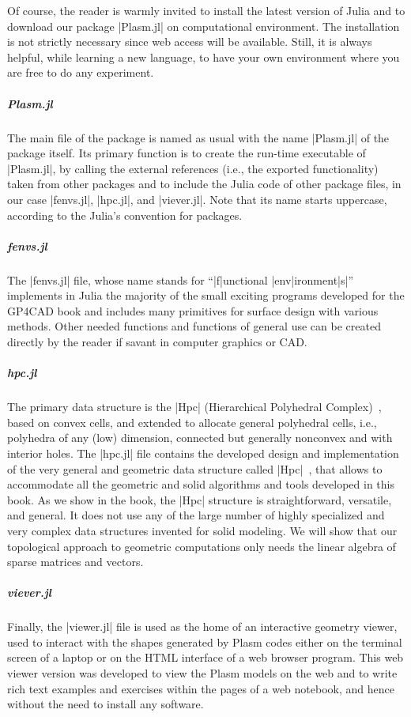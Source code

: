 \begin{script}
Of course, the reader is warmly invited to install the latest version of Julia and to download our package |Plasm.jl| on computational environment. The installation is not strictly necessary since web access will be available. Still, it is always helpful, while learning a new language, to have your own environment where you are free to do any experiment.

\subparagraph{Plasm.jl}
The main file of the package is named as usual with the name |Plasm.jl| of the package itself. Its primary function is to create the run-time executable of |Plasm.jl|, by calling the external references (i.e., the exported functionality) taken from other packages and to include the Julia code of other package files, in our case |fenvs.jl|, |hpc.jl|, and |viever.jl|. Note that its name starts uppercase, according to the Julia’s convention for packages.

\subparagraph{fenvs.jl}
The |fenvs.jl| file, whose name stands for “|f|unctional |env|ironment|s|” implements in Julia the majority of the small exciting programs developed for the GP4CAD book and includes many primitives for surface design with various methods. Other needed functions and functions of general use can be created directly by the reader if savant in computer graphics or CAD.

\subparagraph{hpc.jl}
The primary data structure is the |Hpc| (Hierarchical Polyhedral Complex)~\cite{}, based on convex cells, and extended to allocate general polyhedral cells, i.e., polyhedra of any (low) dimension, connected but generally nonconvex and with interior holes. 
The |hpc.jl| file contains the developed design and implementation of the very general and   geometric data structure called |Hpc|~\cite{}, that allows to accommodate all the geometric and solid algorithms and tools developed in this book. As we show in the book, the |Hpc| structure is straightforward, versatile, and general. It does not use any of the large number of highly specialized and very complex data structures invented for solid modeling. We will show that our topological approach to geometric computations only needs the linear algebra of sparse matrices and vectors.

\subparagraph{viever.jl}
Finally, the |viewer.jl| file is used as the home of an interactive geometry viewer, used to interact with the shapes generated by Plasm codes either on the terminal screen of a laptop or on the HTML interface of a web browser program. This web viewer version was developed to view the Plasm models on the web and to write rich text examples and exercises within the pages of a web notebook, and hence without the need to install any software.






\end{script}
